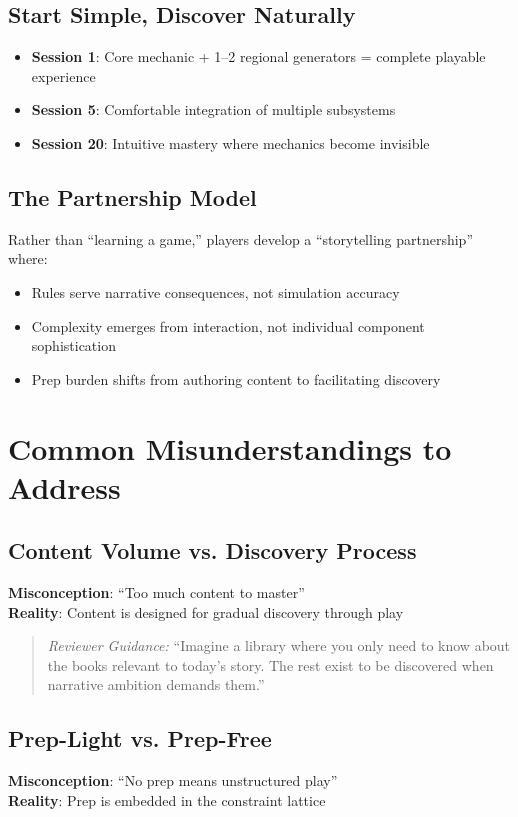 \documentclass[11pt]{article}
\begin{document}
\subsection{Start Simple, Discover Naturally}
\begin{itemize}
    \item \textbf{Session 1}: Core mechanic + 1--2 regional generators = complete playable experience
    \item \textbf{Session 5}: Comfortable integration of multiple subsystems
    \item \textbf{Session 20}: Intuitive mastery where mechanics become invisible
\end{itemize}

\subsection{The Partnership Model}
Rather than ``learning a game,'' players develop a ``storytelling partnership'' where:
\begin{itemize}
    \item Rules serve narrative consequences, not simulation accuracy
    \item Complexity emerges from interaction, not individual component sophistication
    \item Prep burden shifts from authoring content to facilitating discovery
\end{itemize}

\section{Common Misunderstandings to Address}

\subsection{Content Volume vs. Discovery Process}
\textbf{Misconception}: ``Too much content to master'' \\
\textbf{Reality}: Content is designed for gradual discovery through play

\begin{quote}
\textit{Reviewer Guidance:} ``Imagine a library where you only need to know about the books relevant to today's story. The rest exist to be discovered when narrative ambition demands them.''
\end{quote}

\subsection{Prep-Light vs. Prep-Free}
\textbf{Misconception}: ``No prep means unstructured play'' \\
\textbf{Reality}: Prep is embedded in the constraint lattice
\end{document}
